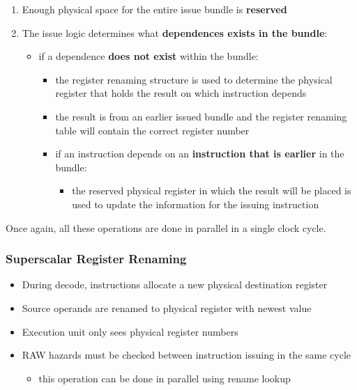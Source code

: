 \documentclass[english]{article}
\begin{document}
\begin{enumerate}
  \item Enough physical space for the entire issue bundle is \textbf{reserved}
  \item The issue logic determines what \textbf{dependences exists in the bundle}:
        \begin{itemize}
          \item if a dependence \textbf{does not exist} within the bundle:
                \begin{itemize}
                  \item the register renaming structure is used to determine the physical register that holds the result on which instruction depends
                  \item the result is from an earlier issued bundle and the register renaming table will contain the correct register number
                \end{itemize}
                \begin{itemize}
                  \item if an instruction depends on an \textbf{instruction that is earlier} in the bundle:
                        \begin{itemize}
                          \item the reserved physical register in which the result will be placed is used to update the information for the issuing instruction
                        \end{itemize}
                \end{itemize}
        \end{itemize}
\end{enumerate}

Once again, all these operations are done in parallel in a single clock cycle.

\subsubsection{Superscalar Register Renaming}

\begin{itemize}
  \item During decode, instructions allocate a new physical destination register
  \item Source operands are renamed to physical register with newest value
  \item Execution unit only sees physical register numbers
  \item RAW hazards must be checked between instruction issuing in the same cycle
        \begin{itemize}
          \item this operation can be done in parallel using rename lookup
        \end{itemize}
\end{itemize}
\end{document}
